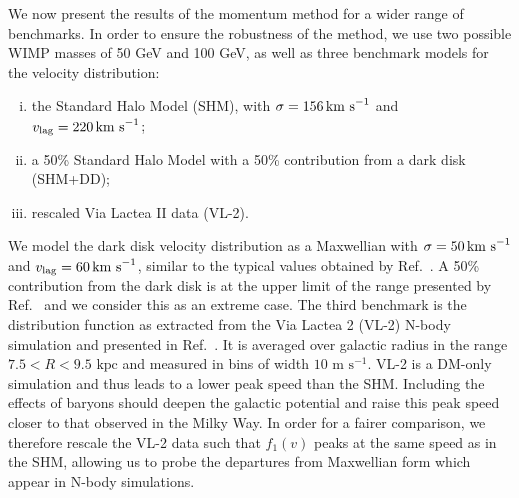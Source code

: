 We now present the results of the momentum method for a wider range of benchmarks. In order to ensure the robustness of the method, we use two possible WIMP masses of 50 GeV and 100 GeV, as well as three benchmark models for the velocity distribution:

\begin{enumerate}[(i)]
\item the Standard Halo Model (SHM), with \(\sigma = 156 \,\textrm{km s}^{-1}\) and \(v_\textrm{lag} = 220 \,\textrm{km s}^{-1}\);
\item a 50\% Standard Halo Model with a 50\% contribution from a dark disk (SHM+DD);
\item rescaled Via Lactea II data (VL-2).
\end{enumerate}

We model the dark disk velocity distribution as a Maxwellian with \(\sigma = 50 \,\textrm{km s}^{-1}\) and \(v_\textrm{lag} = 60 \,\textrm{km s}^{-1}\), similar to the typical values obtained by Ref.\ \cite{Purcell:2009}. A 50\% contribution from the dark disk is at the upper limit of the range presented by Ref.\ \cite{Read:2010} and we consider this as an extreme case. The third benchmark is the distribution function as extracted from the Via Lactea 2 (VL-2) N-body simulation \cite{Diemand:2008} and presented in Ref.\ \cite{Kuhlen:2010}. It is averaged over galactic radius in the range \(7.5 < R < 9.5 \textrm{ kpc}\) and measured in bins of width \(10 \textrm{ m s}^{-1}\). VL-2 is a DM-only simulation and thus leads to a lower peak speed than the SHM. Including the effects of baryons should deepen the galactic potential and raise this peak speed closer to that observed in the Milky Way. In order for a fairer comparison, we therefore rescale the VL-2 data such that \(f_1(v)\) peaks at the same speed as in the SHM, allowing us to probe the departures from Maxwellian form which appear in N-body simulations.


